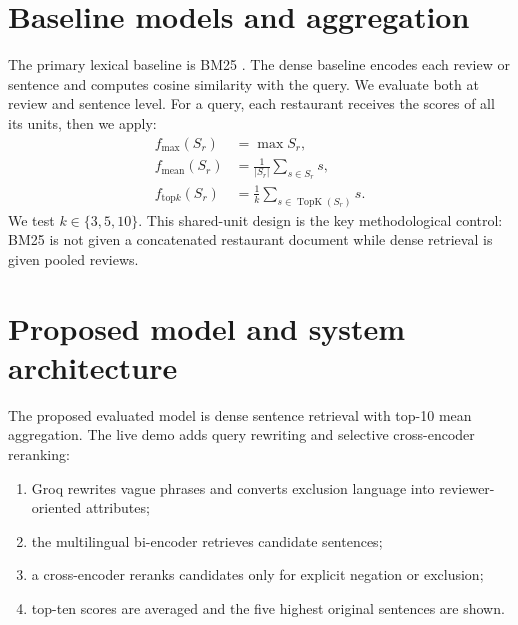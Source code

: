 \section{Baseline models and aggregation}
The primary lexical baseline is BM25 \citep{robertson2009bm25}. The dense baseline encodes
each review or sentence and computes cosine similarity with the query. We evaluate both at
review and sentence level. For a query, each restaurant receives the scores of all its units,
then we apply:
\begin{align}
 f_{\max}(S_r)&=\max S_r,\\
 f_{\mathrm{mean}}(S_r)&=\frac{1}{|S_r|}\sum_{s\in S_r}s,\\
 f_{\mathrm{top}k}(S_r)&=\frac{1}{k}\sum_{s\in \operatorname{TopK}(S_r)}s.
\end{align}
We test $k\in\{3,5,10\}$. This shared-unit design is the key methodological control: BM25 is
not given a concatenated restaurant document while dense retrieval is given pooled reviews.

\section{Proposed model and system architecture}
The proposed evaluated model is dense sentence retrieval with top-10 mean aggregation. The
live demo adds query rewriting and selective cross-encoder reranking:
\begin{enumerate}
  \item Groq rewrites vague phrases and converts exclusion language into reviewer-oriented
  attributes;
  \item the multilingual bi-encoder retrieves candidate sentences;
  \item a cross-encoder reranks candidates only for explicit negation or exclusion;
  \item top-ten scores are averaged and the five highest original sentences are shown.
\end{enumerate}

